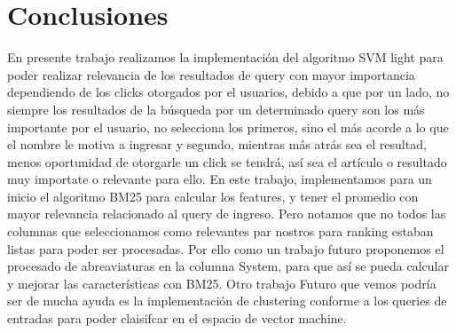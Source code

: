 \documentclass[a4paper,12pt]{article}
\begin{document}
	\section{Conclusiones}
	En presente trabajo realizamos la implementación del algoritmo SVM light para poder realizar relevancia de los resultados de query con mayor importancia dependiendo de los clicks otorgados por el usuarios,
	debido a que por un lado, no siempre los resultados de la búsqueda por un determinado query son los más importante por el usuario, no selecciona los primeros, sino el más acorde a lo que el nombre le motiva a ingresar
	y segundo, mientras más atrás sea el resultad, menos oportunidad de otorgarle un click se tendrá, así sea el artículo o resultado muy importate o relevante para ello.
	En este trabajo, implementamos para un inicio el algoritmo BM25 para calcular los features, y tener el promedio con mayor relevancia relacionado al query de ingreso. Pero notamos que no todos las columnas que seleccionamos como relevantes par
	nostros para ranking estaban listas para poder ser procesadas. Por ello como un trabajo futuro proponemos el procesado de abreaviaturas en la columna System, para que así se pueda calcular y mejorar las características con BM25.
	Otro trabajo Futuro que vemos podría ser de mucha ayuda es la implementación de clustering conforme a los queries de entradas para poder claisifcar en el espacio de vector machine.

	
	
	
	
	

	
	
	
	
\end{document}
